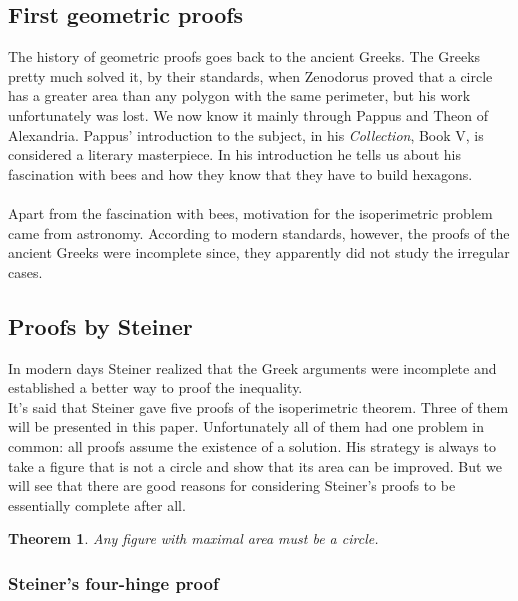 \documentclass[12pt, a4paper, titlepage]{article}
\newtheorem{thm}{Theorem}
\begin{document}
\subsection{First geometric proofs}
The history of geometric proofs goes back to the ancient Greeks. The Greeks pretty much solved it, by their standards, when Zenodorus proved that a circle has a greater area than any polygon with the same perimeter, but his work unfortunately was lost. We now know it mainly through Pappus and Theon of Alexandria. Pappus' introduction to the subject, in his \textit{Collection}, Book V, is considered a literary masterpiece. In his introduction he tells us about his fascination with bees and how they know that they have to build hexagons.\\\\
Apart from the fascination with bees, motivation for the isoperimetric problem came from astronomy.
According to modern standards, however, the proofs of the ancient Greeks were incomplete since, they apparently did not study the irregular cases. 
\newpage
\subsection{Proofs by Steiner}
In modern days Steiner realized that the Greek arguments were incomplete and established a better way to proof the inequality. \\
It's said that Steiner gave five proofs of the isoperimetric theorem. Three of them will be presented in this paper. Unfortunately all of them had one problem in common: all proofs assume the existence of a solution. His strategy is always to take a figure that is not a circle and show that its area can be improved. But we will see that there are good reasons for considering Steiner's proofs to be essentially complete after all.
\begin{thm}
Any figure with maximal area must be a circle.
\end{thm}
\subsubsection*{Steiner's four-hinge proof}
\end{document}
